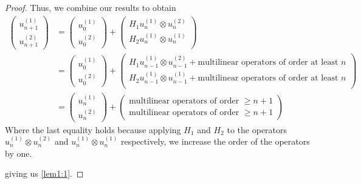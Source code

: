 \documentclass[a4paper, 12pt]{article}
\begin{document}
\begin{proof}
Thus, we combine our results to obtain
\begin{align*}
	\begin{pmatrix} u_{n + 1}^{(1)}\\u_{n + 1}^{(2)} \end{pmatrix}
	&= \begin{pmatrix} u_0^{(1)}\\u_0^{(2)} \end{pmatrix} +
\begin{pmatrix}
		H_1 u_n^{(1)} \otimes u_n^{(2)}\\
		H_2 u_n^{(1)} \otimes u_n^{(1)}\\
\end{pmatrix}\\
&= \begin{pmatrix} u_0^{(1)}\\u_0^{(2)} \end{pmatrix} +
\begin{pmatrix}
		H_1 u_{n-1}^{(1)} \otimes u_{n-1}^{(2)}+ \text{multilinear operators of order at least $n$}\\
		H_2 u_{n-1}^{(1)} \otimes u_{n-1}^{(1)}+ \text{multilinear operators of order at least $n$}\\
\end{pmatrix}\\
&= \begin{pmatrix} u_n^{(1)}\\u_n^{(2)} \end{pmatrix}
+ \begin{pmatrix} \text{multilinear operators of order $\ge n + 1$}\\\text{multilinear operators of order $\ge n + 1$} \end{pmatrix}
\end{align*}
Where the last equality holds because applying $H_1$ and $H_2$ to the operators $u_n^{(1)}\otimes u_n^{(2)}$ and $u_n^{(1)}\otimes u_n^{(1)}$ respectively, we increase the order of the operators by one.

giving us \cref{lem1:1}.
\end{proof}
\end{document}
